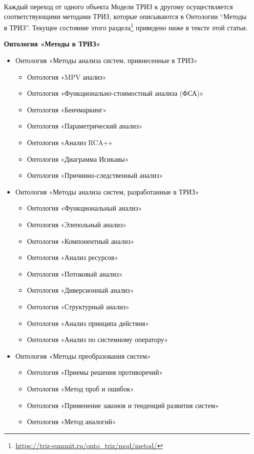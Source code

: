 \documentclass[11pt,a4paper]{article}
\begin{document}
Каждый переход от одного объекта Модели ТРИЗ к другому осуществляется
соответствующими методами ТРИЗ, которые описываются в Онтологии “Методы в
ТРИЗ”. Текущее состояние этого
раздела\footnote{\url{https://triz-summit.ru/onto_triz/mod/metod/}} приведено
ниже в тексте этой статьи.

\textbf{Онтология «Методы в ТРИЗ»}
\begin{itemize}
\item Онтология «Методы анализа систем, привнесенные в ТРИЗ»
  \begin{itemize}[noitemsep]
  \item Онтология «MPV анализ»
  \item Онтология «Функционально-стоимостный анализа (ФСА)»
  \item Онтология «Бенчмаркинг»
  \item Онтология «Параметрический анализ»
  \item Онтология «Анализ RCA+»
  \item Онтология «Диаграмма Исикавы»
  \item Онтология «Причинно-следственный анализ»
  \end{itemize}
\item Онтология «Методы анализа систем, разработанные в ТРИЗ»
  \begin{itemize}[noitemsep]
  \item Онтология «Функциональный анализ»
  \item Онтология «Элепольный анализ»
  \item Онтология «Компонентный анализ»
  \item Онтология «Анализ ресурсов»
  \item Онтология «Потоковый анализ»
  \item Онтология «Диверсионный анализ»
  \item Онтология «Структурный анализ»
  \item Онтология «Анализ принципа действия»
  \item Онтология «Анализ по системному оператору»
  \end{itemize}
\item Онтология «Методы преобразования систем»
  \begin{itemize}[noitemsep]
  \item Онтология «Приемы решения противоречий»
  \item Онтология «Метод проб и ошибок»
  \item Онтология «Применение законов и тенденций развития систем»
  \item Онтология «Метод аналогий»

\end{itemize}
\end{itemize}
\end{document}
